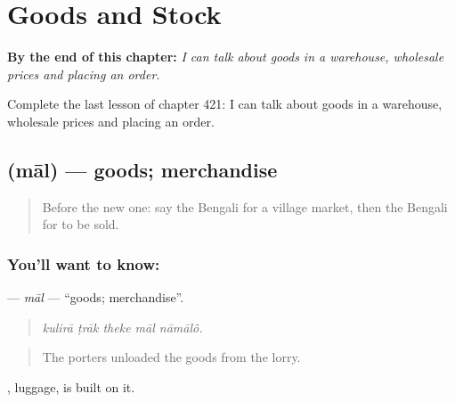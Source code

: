 
\chapter{Goods and Stock}
\label{ch:bn-goods-and-stock}

\begin{chapteropening}
\textbf{By the end of this chapter:} \emph{I can talk about goods in a warehouse, wholesale prices and placing an order.}

Complete the last lesson of chapter 421: I can talk about goods in a warehouse, wholesale prices and placing an order.
\end{chapteropening}

\section[\texorpdfstring{\bn{মাল} (māl)}{মাল (māl)}]{ (māl) — goods; merchandise}

\label{lesson:BN-C421-mal}



\begin{quote}
Before the new one: say the Bengali for a village market, then the Bengali for to be sold.
\end{quote}

\subsection*{You'll want to know: }
\textbf{} — \emph{māl} — \textquotedblleft{}goods; merchandise\textquotedblright{}.

\begin{quote}
    
\end{quote}

\begin{quote}
\emph{kulirā ṭrāk theke māl nāmālô.}
\end{quote}

\begin{quote}
The porters unloaded the goods from the lorry.
\end{quote}

, luggage, is built on it.

